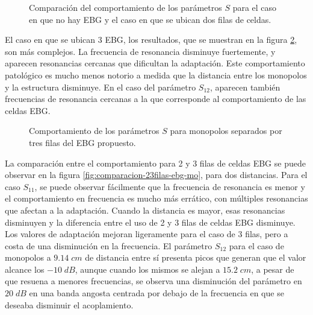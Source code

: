 \begin{figure}[H]
	\centering 
	\hspace{0pt}
	\caption{Comparación del comportamiento de los parámetros $S$ para el caso en que no hay EBG y el caso en que se ubican dos filas de celdas.}
	\label{fig:comparacion-2filas-ebg-mo}
\end{figure} 

El caso en que se ubican 3 EBG, los resultados, que se muestran en la figura \ref{fig:comparacion-3filas-ebg-mo}, son más complejos. La frecuencia de resonancia disminuye fuertemente, y aparecen resonancias cercanas que dificultan la adaptación. Este comportamiento patológico es mucho menos notorio a medida que la distancia entre los monopolos y la estructura disminuye. En el caso del parámetro $S_{12}$, aparecen también frecuencias de resonancia cercanas a la que corresponde al comportamiento de las celdas EBG.

\begin{figure}[H]
	\centering 
	\hspace{0pt}
	\caption{Comportamiento de los parámetros $S$ para monopolos separados por tres filas del EBG propuesto.}
	\label{fig:comparacion-3filas-ebg-mo}
\end{figure}

La comparación entre el comportamiento para 2 y 3 filas de celdas EBG se puede observar en la figura \ref{fig:comparacion-23filas-ebg-mo}, para dos distancias. Para el caso $S_{11}$, se puede observar fácilmente que la frecuencia de resonancia es menor y el comportamiento en frecuencia es mucho más errático, con múltiples resonancias que afectan a la adaptación. Cuando la distancia es mayor, esas resonancias disminuyen y la diferencia entre el uso de 2 y 3 filas de celdas EBG disminuye. Los valores de adaptación mejoran ligeramente para el caso de 3 filas, pero a costa de una disminución en la frecuencia. El parámetro $S_{12}$ para el caso de monopolos a $9.14\; cm$ de distancia entre sí presenta picos que generan que el valor alcance los $-10\;dB$, aunque cuando los mismos se alejan a $15.2\;cm$, a pesar de que resuena a menores frecuencias, se observa una disminución del parámetro en $20\; dB$ en una banda angosta centrada por debajo de la frecuencia en que se deseaba disminuir el acoplamiento.

